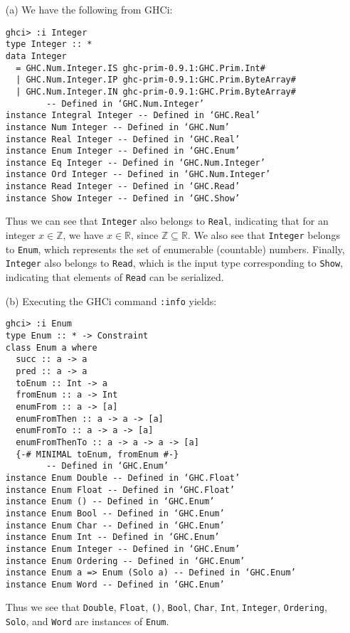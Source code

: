
\begin{itemize}
    \item[(a)] We have the following from GHCi:
        \small\begin{verbatim}
ghci> :i Integer
type Integer :: *
data Integer
  = GHC.Num.Integer.IS ghc-prim-0.9.1:GHC.Prim.Int#
  | GHC.Num.Integer.IP ghc-prim-0.9.1:GHC.Prim.ByteArray#
  | GHC.Num.Integer.IN ghc-prim-0.9.1:GHC.Prim.ByteArray#
        -- Defined in ‘GHC.Num.Integer’
instance Integral Integer -- Defined in ‘GHC.Real’
instance Num Integer -- Defined in ‘GHC.Num’
instance Real Integer -- Defined in ‘GHC.Real’
instance Enum Integer -- Defined in ‘GHC.Enum’
instance Eq Integer -- Defined in ‘GHC.Num.Integer’
instance Ord Integer -- Defined in ‘GHC.Num.Integer’
instance Read Integer -- Defined in ‘GHC.Read’
instance Show Integer -- Defined in ‘GHC.Show’
        \end{verbatim}\normalsize
        Thus we can see that \verb|Integer| also belongs to \verb|Real|,
        indicating that for an integer $x \in \mathbb{Z}$, we have $x \in \mathbb{R}$, 
        since $\mathbb{Z} \subseteq \mathbb{R}$. We also see that \verb|Integer|
        belongs to \verb|Enum|, which represents the set of enumerable (countable) 
        numbers. Finally, \verb|Integer| also belongs to \verb|Read|, which is the
        input type corresponding to \verb|Show|, indicating that elements of 
        \verb|Read| can be serialized.
    \item[(b)] Executing the GHCi command \verb|:info| yields:
        \small\begin{verbatim}
ghci> :i Enum
type Enum :: * -> Constraint
class Enum a where
  succ :: a -> a
  pred :: a -> a
  toEnum :: Int -> a
  fromEnum :: a -> Int
  enumFrom :: a -> [a]
  enumFromThen :: a -> a -> [a]
  enumFromTo :: a -> a -> [a]
  enumFromThenTo :: a -> a -> a -> [a]
  {-# MINIMAL toEnum, fromEnum #-}
        -- Defined in ‘GHC.Enum’
instance Enum Double -- Defined in ‘GHC.Float’
instance Enum Float -- Defined in ‘GHC.Float’
instance Enum () -- Defined in ‘GHC.Enum’
instance Enum Bool -- Defined in ‘GHC.Enum’
instance Enum Char -- Defined in ‘GHC.Enum’
instance Enum Int -- Defined in ‘GHC.Enum’
instance Enum Integer -- Defined in ‘GHC.Enum’
instance Enum Ordering -- Defined in ‘GHC.Enum’
instance Enum a => Enum (Solo a) -- Defined in ‘GHC.Enum’
instance Enum Word -- Defined in ‘GHC.Enum’
        \end{verbatim}\normalsize
        Thus we see that \verb|Double|, \verb|Float|, \verb|()|, \verb|Bool|, 
        \verb|Char|, \verb|Int|, \verb|Integer|, \verb|Ordering|, \verb|Solo|,
        and \verb|Word| are instances of \verb|Enum|.
\end{itemize}
